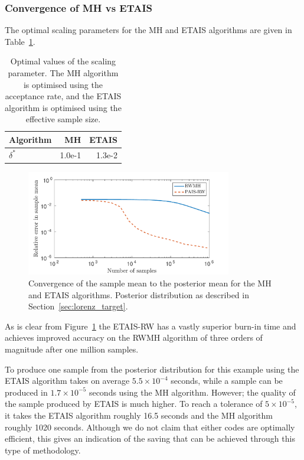 \documentclass[final]{siamltex}
\begin{document}
\subsubsection{Convergence of MH vs ETAIS}\label{sec:lorenz_conv}

The optimal scaling parameters for the MH and ETAIS algorithms are given in Table~\ref{table:Lorenz_opt_parameters}.

\begin{table}[!htb]
      \centering
        \begin{tabular}{|l|r|r|}
	\hline
	Algorithm	& MH & ETAIS \\ \hline
	$\delta^*$	& 1.0e-1     & 1.3e-2 \\
	\hline
	\end{tabular}
	\vspace{1mm}
	\caption{Optimal values of the scaling parameter. The MH algorithm is optimised using the acceptance rate, and the ETAIS algorithm is optimised using the effective sample size.}
	\label{table:Lorenz_opt_parameters}
\end{table}

\begin{figure}[htb]
\centering
\includegraphics[width=0.8\textwidth]{"figures/Lorenz_convergence"}
\caption{Convergence of the sample mean to the posterior mean for the MH and ETAIS algorithms. Posterior distribution as described in Section~\ref{sec:lorenz_target}.}
\label{fig:Lorenz_convergence}
\end{figure}

As is clear from Figure~\ref{fig:Lorenz_convergence} the ETAIS-RW has a vastly superior burn-in time and achieves improved accuracy on the RWMH algorithm of three orders of magnitude after one million samples.

To produce one sample from the posterior distribution for this example
using the ETAIS algorithm takes on average $5.5\times 10^{-4}$ seconds,
while a sample can be produced in $1.7\times 10^{-5}$ seconds using
the MH algorithm. However; the quality of the sample produced by ETAIS
is much higher. To reach a tolerance of $5\times 10^{-5}$, it takes
the ETAIS algorithm roughly 16.5 seconds and the MH algorithm roughly
1020 seconds. Although we do not claim that either codes are optimally
efficient, this gives an indication of the saving that can be achieved
through this type of methodology.
\end{document}
